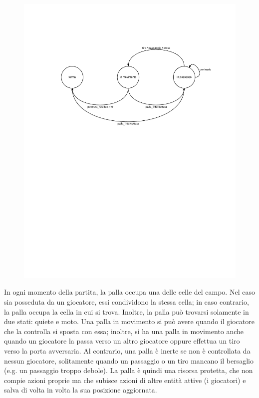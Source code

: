 \begin{figure}[htp!]
	\centering
	\includegraphics[scale=.8]{images/ball_state_diagram}
\end{figure}

In ogni momento della partita, la palla occupa una delle celle del campo. Nel caso sia posseduta da un giocatore, essi condividono la stessa cella; in caso contrario, la palla occupa la cella in cui si trova. Inoltre, la palla può trovarsi solamente in due stati: quiete e moto. Una palla in movimento si può avere quando il giocatore che la controlla si sposta con essa; inoltre, si ha una palla in movimento anche quando un giocatore la passa verso un altro giocatore oppure effettua un tiro verso la porta avversaria. Al contrario, una palla è inerte se non è controllata da nessun giocatore, solitamente quando un passaggio o un tiro mancano il bersaglio (e.g. un passaggio troppo debole). La palla è quindi una risorsa protetta, che non compie azioni proprie ma che subisce azioni di altre entità attive (i giocatori) e salva di volta in volta la sua posizione aggiornata.\\


